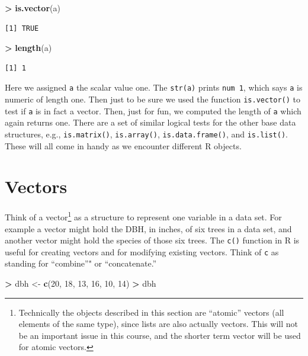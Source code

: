 \documentclass[]{krantz}
\makeatletter
\newenvironment{Shaded}{\begin{snugshade}}{\end{snugshade}}
\newcommand{\KeywordTok}[1]{\textcolor[rgb]{0.27,0.27,0.27}{\textbf{#1}}}
\newcommand{\DecValTok}[1]{\textcolor[rgb]{0.06,0.06,0.06}{#1}}
\newcommand{\StringTok}[1]{\textcolor[rgb]{0.5,0.5,0.5}{#1}}
\newcommand{\OperatorTok}[1]{\textcolor[rgb]{0.43,0.43,0.43}{\textbf{#1}}}
\newcommand{\NormalTok}[1]{#1}
\newenvironment{kframe}{%
\medskip{}
\setlength{\fboxsep}{.8em}
 \def\at@end@of@kframe{}%
 \ifinner\ifhmode%
  \def\at@end@of@kframe{\end{minipage}}%
  \begin{minipage}{\columnwidth}%
 \fi\fi%
 \def\FrameCommand##1{\hskip\@totalleftmargin \hskip-\fboxsep
 \colorbox{shadecolor}{##1}\hskip-\fboxsep
     \hskip-\linewidth \hskip-\@totalleftmargin \hskip\columnwidth}%
 \MakeFramed {\advance\hsize-\width
   \@totalleftmargin\z@ \linewidth\hsize
   \@setminipage}}%
 {\par\unskip\endMakeFramed%
 \at@end@of@kframe}
\renewenvironment{Shaded}{\begin{kframe}}{\end{kframe}}
\theoremstyle{definition}
\theoremstyle{definition}
\theoremstyle{definition}
\theoremstyle{remark}
\makeatother
\begin{document}
\begin{Shaded}
\begin{Highlighting}[]
\OperatorTok{>}\StringTok{ }\KeywordTok{is.vector}\NormalTok{(a)}
\end{Highlighting}
\end{Shaded}

\begin{verbatim}
[1] TRUE
\end{verbatim}

\begin{Shaded}
\begin{Highlighting}[]
\OperatorTok{>}\StringTok{ }\KeywordTok{length}\NormalTok{(a)}
\end{Highlighting}
\end{Shaded}

\begin{verbatim}
[1] 1
\end{verbatim}

Here we assigned \texttt{a} the scalar value one. The \texttt{str(a)}
prints \texttt{num\ 1}, which says \texttt{a} is numeric of length one.
Then just to be sure we used the function \texttt{is.vector()} to test
if \texttt{a} is in fact a vector. Then, just for fun, we computed the
length of \texttt{a} which again returns one. There are a set of similar
logical tests for the other base data structures, e.g.,
\texttt{is.matrix()}, \texttt{is.array()}, \texttt{is.data.frame()}, and
\texttt{is.list()}. These will all come in handy as we encounter
different R objects.

\section{Vectors}\label{vectors}

Think of a vector\footnote{Technically the objects described in this
  section are ``atomic'' vectors (all elements of the same type), since
  lists are also actually vectors. This will not be an important issue
  in this course, and the shorter term vector will be used for atomic
  vectors.} as a structure to represent one variable in a data set. For
example a vector might hold the DBH, in inches, of six trees in a data
set, and another vector might hold the species of those six trees. The
\texttt{c()} function in R is useful for creating vectors and for
modifying existing vectors. Think of \texttt{c} as standing for
``combine''" or ``concatenate.''

\begin{Shaded}
\begin{Highlighting}[]
\OperatorTok{>}\StringTok{ }\NormalTok{dbh <-}\StringTok{ }\KeywordTok{c}\NormalTok{(}\DecValTok{20}\NormalTok{, }\DecValTok{18}\NormalTok{, }\DecValTok{13}\NormalTok{, }\DecValTok{16}\NormalTok{, }\DecValTok{10}\NormalTok{, }\DecValTok{14}\NormalTok{)}
\OperatorTok{>}\StringTok{ }\NormalTok{dbh}
\end{Highlighting}
\end{Shaded}
\end{document}

